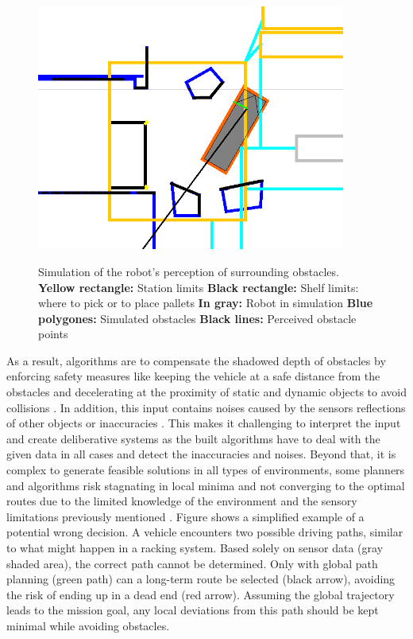 \begin{figure}[H]
    \begin{center}
        \includegraphics[width=4in]{images/Chap1/scan.png}\\
        \caption{
        Simulation of the robot's perception of surrounding obstacles.
        \newline \textbf{Yellow rectangle:} Station limits
        \newline \textbf{Black rectangle:} Shelf limits: where to pick or to place pallets
        \newline \textbf{In gray:} Robot in simulation
        \newline \textbf{Blue polygones:} Simulated obstacles
        \newline \textbf{Black lines:} Perceived obstacle points}
        \label{scamSim}
        \end{center}
\end{figure}

As a result, algorithms are to compensate the shadowed depth of obstacles by enforcing safety measures like 
keeping the vehicle at a safe distance from the obstacles and decelerating at the proximity 
of static and dynamic objects to avoid collisions .
In addition, this input contains noises caused by the sensors reflections of other objects
or inaccuracies . 
This makes it challenging to interpret the input and create deliberative systems as the built algorithms have to 
deal with the given data
in all cases and detect the inaccuracies and noises.
Beyond that, it is complex to generate feasible solutions in all types of environments,
some planners and algorithms risk stagnating in local minima and not converging to the optimal routes
due to the limited knowledge of the environment and the sensory limitations previously mentioned . 
Figure  shows a simplified example of a potential wrong decision. A vehicle encounters two possible 
driving paths, similar to what might happen in a racking system. Based solely on sensor data 
(gray shaded area), the correct path cannot be determined. Only with global path planning (green path) 
can a long-term route be selected (black arrow), avoiding the risk of ending up in a dead end (red arrow). 
Assuming the global trajectory leads to the mission goal, any local deviations from this path should be 
kept minimal while avoiding obstacles.

